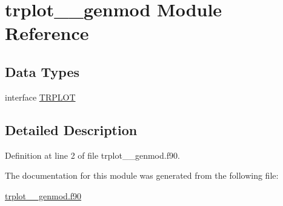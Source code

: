 \hypertarget{classtrplot____genmod}{\section{trplot\+\_\+\+\_\+genmod Module Reference}
\label{classtrplot____genmod}
}
\subsection*{Data Types}
\begin{DoxyCompactItemize}
\item 
interface \hyperlink{interfacetrplot____genmod_1_1TRPLOT}{T\+R\+P\+L\+O\+T}
\end{DoxyCompactItemize}


\subsection{Detailed Description}


Definition at line 2 of file trplot\+\_\+\+\_\+genmod.\+f90.



The documentation for this module was generated from the following file\+:\begin{DoxyCompactItemize}
\item 
\hyperlink{trplot____genmod_8f90}{trplot\+\_\+\+\_\+genmod.\+f90}\end{DoxyCompactItemize}
